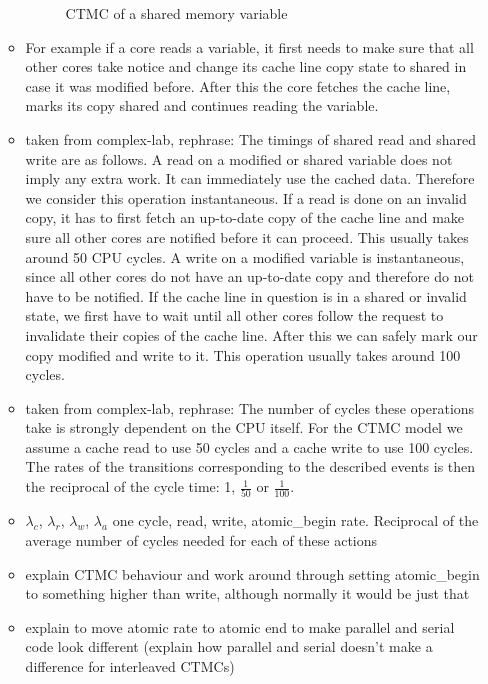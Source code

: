 \documentclass[a4paper, 10pt]{article}
\begin{document}
\begin{enumerate}
\begin{itemize}
\begin{figure}[htbp]
			\centering
			
			\caption{CTMC of a shared memory variable}
			\label{fig:shared-memory-control-flow}
		\end{figure}
	\item For example if a core reads a variable, it first needs to make sure that all other cores take notice and change its cache line copy state to shared in case it was modified before. After this the core fetches the cache line, marks its copy shared and continues reading the variable.
	\item taken from complex-lab, rephrase: The timings of shared read and shared write are as follows. A read on a modified or shared variable does not imply any extra work. It can immediately use the cached data. Therefore we consider this operation instantaneous. If a read is done on an invalid copy, it has to first fetch an up-to-date copy of the cache line and make sure all other cores are notified before it can proceed. This usually takes around 50 CPU cycles. A write on a modified variable is instantaneous, since all other cores do not have an up-to-date copy and therefore do not have to be notified. If the cache line in question is in a shared or invalid state, we first have to wait until all other cores follow the request to invalidate their copies of the cache line. After this we can safely mark our copy modified and write to it. This operation usually takes around 100 cycles.
	\item taken from complex-lab, rephrase: The number of cycles these operations take is strongly dependent on the CPU itself. For the CTMC model we assume a cache read to use 50 cycles and a cache write to use 100 cycles. The rates of the transitions corresponding to the described events is then the reciprocal of the cycle time: 1, $\frac{1}{50}$ or $\frac{1}{100}$.
	\item $\lambda_c$, $\lambda_r$, $\lambda_w$, $\lambda_a$ one cycle, read, write, atomic\_begin rate. Reciprocal of the average number of cycles needed for each of these actions
	\item explain CTMC behaviour and work around through setting atomic\_begin to something higher than write, although normally it would be just that
	\item explain to move atomic rate to atomic end to make parallel and serial code look different (explain how parallel and serial doesn't make a difference for interleaved CTMCs)
\end{itemize}


\end{enumerate}
\end{document}

